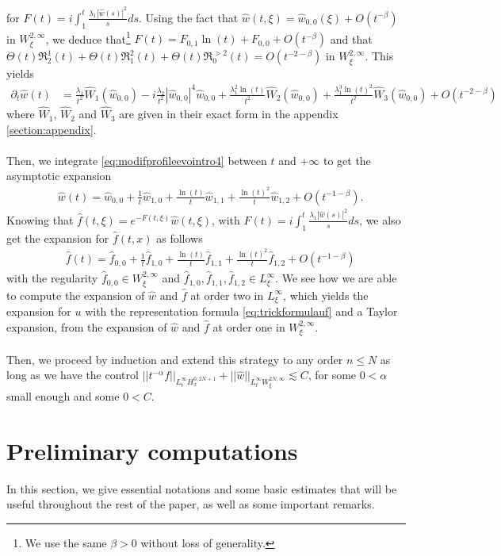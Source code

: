 \documentclass[a4paper, 15pt]{article}
\numberwithin{equation}{section}
\begin{document}
for $F(t)=i\int^t_1\frac{\lambda_1|\hat{w}(s)|^2}{s}ds$. Using the fact that $\hat{w}(t,\xi)=\hat{w}_{0,0}(\xi)+O(t^{-\beta})$ in $W^{2,\infty}_\xi$, we deduce that\footnote{We use the same $\beta>0$ without loss of generality.} $F(t)=F_{0,1}\ln(t)+F_{0,0}+O(t^{-\beta})$ and that $\Theta(t)\mathfrak{R}^1_2(t)+\Theta(t)\mathfrak{R}^2_1(t)+\Theta(t)\mathfrak{R}^{>2}_0(t)=O(t^{-2-\beta})$ in $W^{2,\infty}_\xi$.  This yields 
\begin{align}
\label{eq:modifprofileevointro4}
\partial_t\hat{w}(t)&=\frac{\lambda_1}{t^2}\hat{W}_1(\hat{w}_{0,0})-i\frac{\lambda_2}{t^2}|\hat{w}_{0,0}|^4\hat{w}_{0,0}+\frac{\lambda_1^2\ln(t)}{t^2}\hat{W}_2(\hat{w}_{0,0})+\frac{\lambda_1^3\ln(t)^2}{t^2}\hat{W}_3(\hat{w}_{0,0})+O(t^{-2-\beta})
\end{align}
where $\hat{W}_1$, $\hat{W}_2$ and $\hat{W}_3$ are given in their exact form in the appendix \ref{section:appendix}.\\\\
Then, we integrate \eqref{eq:modifprofileevointro4} between $t$ and $+\infty$ to get the asymptotic expansion
\begin{align}
\label{eq:modifprofileevointro5}
&\hat{w}(t)=\hat{w}_{0,0}+\frac{1}{t}\hat{w}_{1,0}+\frac{\ln(t)}{t}\hat{w}_{1,1}+\frac{\ln(t)^2}{t}\hat{w}_{1,2}+O(t^{-1-\beta}).
\end{align}
Knowing that $\hat{f}(t,\xi)=e^{-F(t,\xi)}\hat{w}(t,\xi)$, with $F(t)=i\int^t_1\frac{\lambda_1|\hat{w}(s)|^2}{s}ds$, we also get the expansion for $\hat{f}(t,x)$ as follows 
\begin{align}
\label{eq:profileexpintro}
&\hat{f}(t)=\hat{f}_{0,0}+\frac{1}{t}\hat{f}_{1,0}+\frac{\ln(t)}{t}\hat{f}_{1,1}+\frac{\ln(t)^2}{t}\hat{f}_{1,2}+O(t^{-1-\beta})
\end{align}
with the regularity $\hat{f}_{0,0}\in W^{2,\infty}_\xi$ and $\hat{f}_{1,0},\hat{f}_{1,1},\hat{f}_{1,2}\in L^{\infty}_\xi$. We see how we are able to compute the expansion of $\hat{w}$ and $\hat{f}$ at order two in $L^\infty_\xi$, which yields the expansion for $u$ with the representation formula \eqref{eq:trickformulauf} and a Taylor expansion, from the expansion of $\hat{w}$ and $\hat{f}$ at order one in $W^{2,\infty}_\xi$.\\\\
Then, we proceed by induction and extend this strategy to any order $n\leq N$ as long as we have the control $||t^{-\alpha}f||_{L^\infty_t H^{0,2N+1}_x}+||\hat{w}||_{L^\infty_t W^{2N,\infty}_\xi}\lesssim C$, for some $0<\alpha$ small enough and some $0<C$.
\section{Preliminary computations}
\label{section:notation}
In this section, we give essential notations and some basic estimates that will be useful throughout the rest of the paper, as well as some important remarks.
\end{document}
